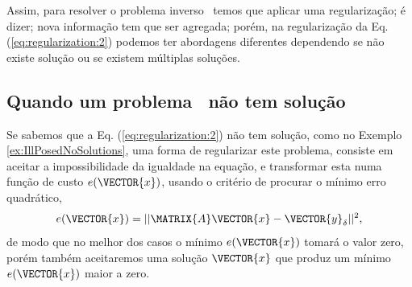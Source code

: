 Assim, para resolver o problema inverso \illposed~temos que aplicar uma regularização;
é dizer; nova informação tem que ser agregada;
porém, na regularização da Eq. (\ref{eq:regularization:2}) podemos ter abordagens diferentes dependendo 
se não existe solução ou se existem múltiplas soluções. 
\subsection{Quando um problema \illposed~não tem solução}
Se sabemos que a Eq. (\ref{eq:regularization:2}) não tem solução, como no Exemplo \ref{ex:IllPosedNoSolutions}, 
uma forma de regularizar este problema, consiste em aceitar a impossibilidade da igualdade na equação, 
e transformar esta numa função de custo $e(\VECTOR{x})$, usando o critério de procurar o mínimo erro quadrático,
\begin{equation}\label{eq:regularization:3}
e(\VECTOR{x})=||\MATRIX{A}\VECTOR{x}-\VECTOR{y}_{\delta}||^2,
\end{equation}
de modo que no melhor dos casos o mínimo $e(\VECTOR{x})$ tomará o valor zero, 
porém também aceitaremos uma solução $\VECTOR{x}$ que produz um mínimo $e(\VECTOR{x})$  maior a zero.
